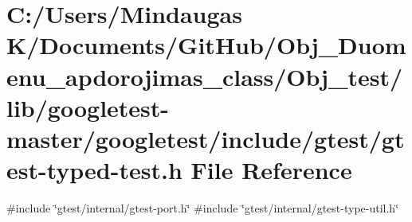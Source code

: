 \hypertarget{_obj__test_2lib_2googletest-master_2googletest_2include_2gtest_2gtest-typed-test_8h}{}\section{C\+:/\+Users/\+Mindaugas K/\+Documents/\+Git\+Hub/\+Obj\+\_\+\+Duomenu\+\_\+apdorojimas\+\_\+class/\+Obj\+\_\+test/lib/googletest-\/master/googletest/include/gtest/gtest-\/typed-\/test.h File Reference}
\label{_obj__test_2lib_2googletest-master_2googletest_2include_2gtest_2gtest-typed-test_8h}
{\ttfamily \#include \char`\"{}gtest/internal/gtest-\/port.\+h\char`\"{}}\newline
{\ttfamily \#include \char`\"{}gtest/internal/gtest-\/type-\/util.\+h\char`\"{}}\newline
